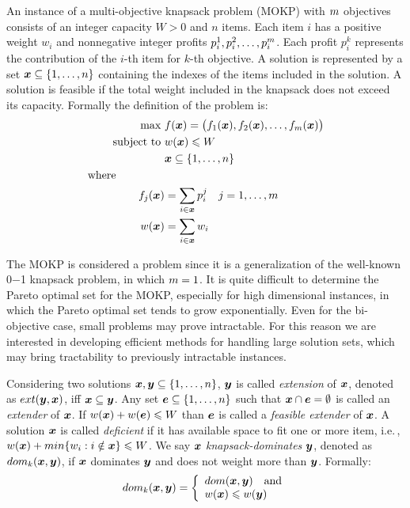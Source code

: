 An instance of a multi-objective knapsack problem (MOKP) with $m$
objectives consists of an integer capacity $W > 0$ and $n$ items.
Each item $i$ has a positive weight $w_i$ and nonnegative integer
profits $p_i^1, p_i^2, \ldots, p_{i}^{m}$.
Each profit $p_i^k$ represents the contribution of the $i$-th item for $k$-th objective.
A solution is represented by a set $\boldsymbol{x} \subseteq \{1, \ldots, n\}$
containing the indexes of the items included in the solution.
A solution is feasible if the total weight included in the knapsack does
not exceed its capacity.
Formally the definition of the problem is:
\begin{align*}
  \text{max   } & f(\boldsymbol{x}) =
    \big(f_1(\boldsymbol{x}) ,f_2(\boldsymbol{x}) ,\ldots ,f_{m}(\boldsymbol{x})\big) \\
  \text{subject to   } & w(\boldsymbol{x}) \leqslant W \\
  & \boldsymbol{x} \subseteq \{1, \ldots, n\}\\
  \text{where} \phantom{mmmmm} \\
  f_j(\boldsymbol{x}) &= \sum_{i \in \boldsymbol{x}} p^j_i \quad j = 1, \ldots, m\\
  w(\boldsymbol{x}) &= \sum_{i \in \boldsymbol{x}} w_i
\end{align*}

The MOKP is considered a \nphard{} problem since it is a generalization
of the well-known 0$-$1 knapsack problem, in which $m = 1$.
It is quite difficult to determine the Pareto optimal set for the MOKP,
especially for high dimensional instances, in which the
Pareto optimal set tends to grow exponentially.
Even for the bi-objective case, small problems may prove intractable.
For this reason we are interested in developing efficient methods for
handling large solution sets, which may bring tractability to previously
intractable instances.

Considering two solutions $\boldsymbol{x}, \boldsymbol{y} \subseteq \{1, \ldots, n\}$, $\boldsymbol{y}$ is
called \emph{extension} of $\boldsymbol{x}$, denoted as $ext(\boldsymbol{y}, \boldsymbol{x})$,
iff $\boldsymbol{x} \subseteq \boldsymbol{y}$.
Any set $\boldsymbol{e} \subseteq \{1, \ldots, n\}$ such that $\boldsymbol{x} \cap \boldsymbol{e} = \emptyset$
is called an \emph{extender} of $\boldsymbol{x}$.
If $w(\boldsymbol{x}) + w(\boldsymbol{e}) \leqslant W$ than $\boldsymbol{e}$ is called a
\emph{feasible extender} of $\boldsymbol{x}$.
A solution $\boldsymbol{x}$ is called \emph{deficient} if it has available space
to fit one or more item, i.e.\,, $w(\boldsymbol{x}) + min\{ w_i : i \notin \boldsymbol{x} \} \leqslant W$.
We say $\boldsymbol{x}$ \emph{knapsack-dominates} $\boldsymbol{y}$, denoted as $dom_k(\boldsymbol{x}, \boldsymbol{y})$,
if $\boldsymbol{x}$ dominates $\boldsymbol{y}$ and does not weight more than $\boldsymbol{y}$.
Formally:
\begin{equation}
  \label{eq:kdom}
  dom_k(\boldsymbol{x}, \boldsymbol{y}) = \left\{
    \begin{array}{l}
      dom(\boldsymbol{x}, \boldsymbol{y}) \quad \text{and} \\
      w(\boldsymbol{x}) \leqslant w(\boldsymbol{y})
    \end{array}
  \right.
\end{equation}

